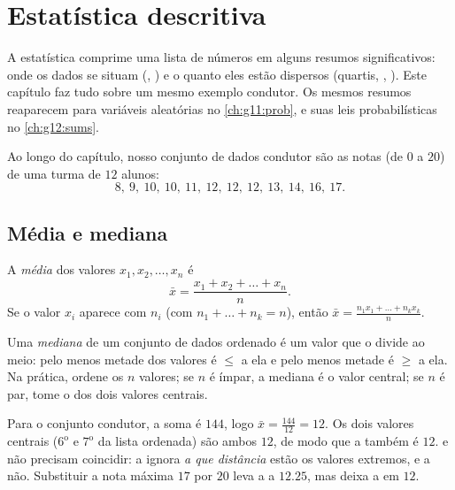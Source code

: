 \chapter{Estatística descritiva}\label{ch:g11:stat}

A estatística comprime uma lista de números em alguns resumos
significativos: onde os dados se situam (, ) e o quanto eles
estão dispersos (quartis, , ). Este capítulo faz
tudo sobre um mesmo exemplo condutor. Os mesmos resumos reaparecem para
variáveis aleatórias no \cref{ch:g11:prob}, e suas leis probabilísticas
no \cref{ch:g12:sums}.

Ao longo do capítulo, nosso conjunto de dados condutor são as notas (de
$0$ a $20$) de uma turma de $12$ alunos:
\[
8,\ 9,\ 10,\ 10,\ 11,\ 12,\ 12,\ 12,\ 13,\ 14,\ 16,\ 17 .
\]

\section{Média e mediana}

\begin{definition}[Média]\label{def:g11:stat:mean}
A \emph{média} dos valores $x_1, x_2, \dots, x_n$ é
\[
\bar x = \frac{x_1 + x_2 + \dots + x_n}{n}.
\]
Se o valor $x_i$ aparece com  $n_i$ (com
$n_1 + \dots + n_k = n$), então
$\bar x = \frac{n_1 x_1 + \dots + n_k x_k}{n}$.
\end{definition}

\begin{definition}[Mediana]\label{def:g11:stat:median}
Uma \emph{mediana} de um conjunto de dados ordenado é um
valor que o divide ao meio: pelo menos metade dos valores é $\leq$ a ela
e pelo menos metade é $\geq$ a ela. Na prática, ordene os $n$ valores; se
$n$ é ímpar, a mediana é o valor central; se $n$ é par, tome o  dos dois valores centrais.
\end{definition}

\begin{example}\label{ex:g11:stat:meanmedian}
Para o conjunto condutor, a soma é $144$, logo
$\bar x = \frac{144}{12} = 12$. Os dois valores centrais ($6^{\text{o}}$
e $7^{\text{o}}$ da lista ordenada) são ambos $12$, de modo que a 
também é $12$.  e  não precisam coincidir: a  ignora
\emph{a que distância} estão os valores extremos, e a  não.
Substituir a nota máxima $17$ por $20$ leva a  a $12.25$, mas deixa
a  em $12$.
\end{example}

